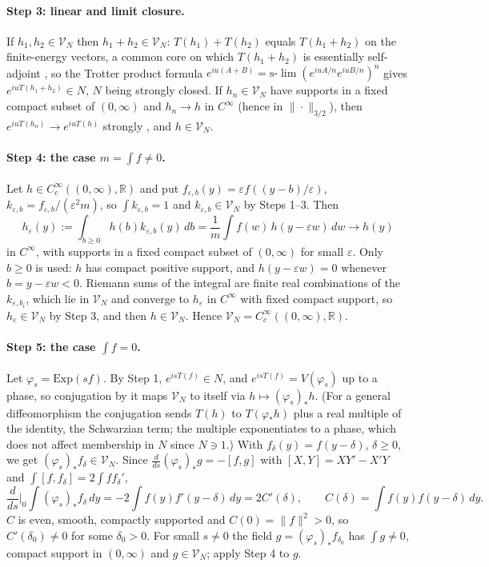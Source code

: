 \documentclass[12pt]{article}
\theoremstyle{definition}
\theoremstyle{remark}
\begin{document}
\paragraph{Step 3: linear and limit closure.} If \(h_1,h_2\in\mathcal V_N\) then
\(h_1+h_2\in\mathcal V_N\): \(T(h_1)+T(h_2)\) equals \(T(h_1+h_2)\) on the finite-energy
vectors, a common core on which \(T(h_1+h_2)\) is essentially self-adjoint
\cite[Thm.~4.4]{CW}, so the Trotter product formula
\(e^{iu(A+B)}=\text{s-}\lim(e^{iuA/n}e^{iuB/n})^n\) gives
\(e^{iuT(h_1+h_2)}\in N\), \(N\) being strongly closed. If \(h_n\in\mathcal V_N\) have
supports in a fixed compact subset of \((0,\infty)\) and \(h_n\to h\) in \(C^\infty\)
(hence in \(\|\cdot\|_{3/2}\)), then \(e^{iuT(h_n)}\to e^{iuT(h)}\) strongly
\cite[Prop.~4.5]{CW}, and \(h\in\mathcal V_N\).

\paragraph{Step 4: the case \(m=\int f\ne0\).} Let \(h\in C_c^\infty((0,\infty),\mathbb R)\)
and put \(f_{\varepsilon,b}(y)=\varepsilon f((y-b)/\varepsilon)\), \(k_{\varepsilon,b}=f_{\varepsilon,b}/(\varepsilon^2m)\), so
\(\int k_{\varepsilon,b}=1\) and \(k_{\varepsilon,b}\in\mathcal V_N\) by Steps 1--3. Then
\[
h_\varepsilon(y):=\int_{b\ge0} h(b)k_{\varepsilon,b}(y)\,db=\frac1m\int f(w)\,h(y-\varepsilon w)\,dw\longrightarrow h(y)
\]
in \(C^\infty\), with supports in a fixed compact subset of \((0,\infty)\) for small
\(\varepsilon\). Only \(b\ge0\) is used: \(h\) has compact positive support, and
\(h(y-\varepsilon w)=0\) whenever \(b=y-\varepsilon w<0\).
Riemann sums of the integral are finite real combinations of the
\(k_{\varepsilon,b_i}\), which lie in \(\mathcal V_N\) and converge to \(h_\varepsilon\) in
\(C^\infty\) with fixed compact support, so \(h_\varepsilon\in\mathcal V_N\) by Step 3, and
then \(h\in\mathcal V_N\). Hence \(\mathcal V_N=C_c^\infty((0,\infty),\mathbb R)\).

\paragraph{Step 5: the case \(\int f=0\).} Let \(\varphi_s=\mathrm{Exp}(sf)\). By Step 1,
\(e^{isT(f)}\in N\), and \(e^{isT(f)}=V(\varphi_s)\) up to a phase, so conjugation by it
maps \(\mathcal V_N\) to itself via \(h\mapsto(\varphi_s)_*h\). (For a general diffeomorphism the conjugation
sends \(T(h)\) to \(T(\varphi_*h)\) plus a real multiple of the identity, the Schwarzian term; the
multiple exponentiates to a phase, which does not affect membership in \(N\) since \(N\ni1\).) With
\(f_\delta(y)=f(y-\delta)\), \(\delta\ge0\), we get \((\varphi_s)_*f_\delta\in\mathcal V_N\).
Since \(\tfrac d{ds}(\varphi_s)_*g=-[f,g]\) with \([X,Y]=XY'-X'Y\) and
\(\int[f,f_\delta]=2\int ff_\delta'\),
\[
\frac d{ds}\Big|_{0}\int(\varphi_s)_*f_\delta\,dy=-2\int f(y)f'(y-\delta)\,dy=2C'(\delta),
\qquad C(\delta)=\int f(y)f(y-\delta)\,dy .
\]
\(C\) is even, smooth, compactly supported and \(C(0)=\|f\|^2>0\), so \(C'(\delta_0)\ne0\)
for some \(\delta_0>0\). For small \(s\ne0\) the field \(g=(\varphi_s)_*f_{\delta_0}\) has
\(\int g\ne0\), compact support in \((0,\infty)\) and \(g\in\mathcal V_N\); apply Step 4 to \(g\).
\end{document}
